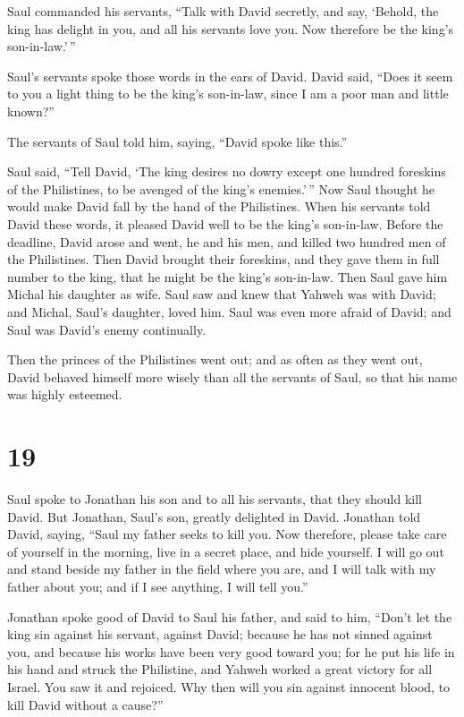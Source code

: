  Saul commanded his servants, ``Talk with David secretly,
and say, `Behold, the king has delight in you, and all his servants love
you. Now therefore be the king's son-in-law.'\,''

 Saul's servants spoke those words in the ears of David.
David said, ``Does it seem to you a light thing to be the king's
son-in-law, since I am a poor man and little known?''

 The servants of Saul told him, saying, ``David spoke
like this.''

 Saul said, ``Tell David, `The king desires no dowry
except one hundred foreskins of the Philistines, to be avenged of the
king's enemies.'\,'' Now Saul thought he would make David fall by the
hand of the Philistines.  When his servants told David
these words, it pleased David well to be the king's son-in-law. Before
the deadline,  David arose and went, he and his men, and
killed two hundred men of the Philistines. Then David brought their
foreskins, and they gave them in full number to the king, that he might
be the king's son-in-law. Then Saul gave him Michal his daughter as
wife.  Saul saw and knew that Yahweh was with David; and
Michal, Saul's daughter, loved him.  Saul was even more
afraid of David; and Saul was David's enemy continually.

 Then the princes of the Philistines went out; and as
often as they went out, David behaved himself more wisely than all the
servants of Saul, so that his name was highly esteemed.

\hypertarget{section-18}{%
\section{19}\label{section-18}}

 Saul spoke to Jonathan his son and to all his servants,
that they should kill David. But Jonathan, Saul's son, greatly delighted
in David.  Jonathan told David, saying, ``Saul my father
seeks to kill you. Now therefore, please take care of yourself in the
morning, live in a secret place, and hide yourself.  I
will go out and stand beside my father in the field where you are, and I
will talk with my father about you; and if I see anything, I will tell
you.''

 Jonathan spoke good of David to Saul his father, and said
to him, ``Don't let the king sin against his servant, against David;
because he has not sinned against you, and because his works have been
very good toward you;  for he put his life in his hand and
struck the Philistine, and Yahweh worked a great victory for all Israel.
You saw it and rejoiced. Why then will you sin against innocent blood,
to kill David without a cause?''

